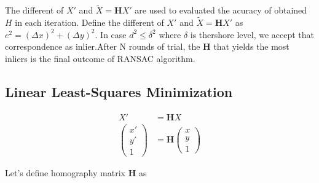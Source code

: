 \documentclass[11pt]{article}
\begin{document}
The different of  $X'$ and $\tilde{X} = \mathbf{H}X'$ are used to evaluated the acuracy of obtained $H$ in each iteration. Define the different of  $X'$ and $\tilde{X} = \mathbf{H}X'$ as $e^2 = (\Delta x)^2 + (\Delta y)^2$. In case $d^2 \leq \delta^2$ where $\delta$ is thershore level, we accept that correspondence as inlier.After N rounds of trial, the $\mathbf{H}$ that yields the most inliers is the final outcome of RANSAC algorithm. 


\subsection*{Linear Least-Squares Minimization}

\begin{align*}
X' &= \mathbf{H}X \\
\begin{pmatrix} x'\\ y'\\ 1\end{pmatrix} &= 
\mathbf{H} 
\begin{pmatrix} x\\ y\\ 1\end{pmatrix}
\end{align*}

Let's define homography matrix $\mathbf{H}$ as
\end{document}
